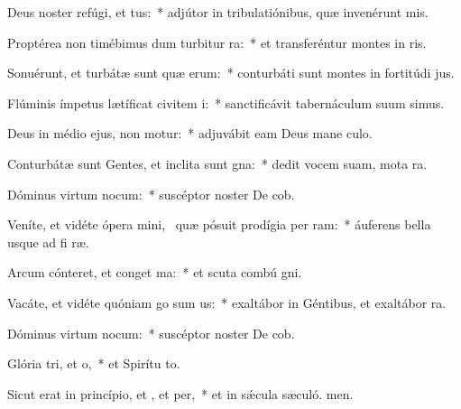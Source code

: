 \item Deus noster refúgi, et tus:~* adjútor in tribulatiónibus, quæ invenérunt  mis.
\item Proptérea non timébimus dum turbitur ra:~* et transferéntur montes in  ris.
\item Sonuérunt, et turbátæ sunt quæ erum:~* conturbáti sunt montes in fortitúdi jus.
\item Flúminis ímpetus lætíficat civitem i:~* sanctificávit tabernáculum suum simus.
\item Deus in médio ejus, non motur:~* adjuvábit eam Deus mane culo.
\item Conturbátæ sunt Gentes, et inclita sunt gna:~* dedit vocem suam, mota  ra.
\item Dóminus virtum nocum:~* suscéptor noster De cob.
\item Veníte, et vidéte ópera mini,~\pscross{} quæ pósuit prodígia per ram:~* áuferens bella usque ad fi ræ.
\item Arcum cónteret, et conget ma:~* et scuta combú gni.
\item Vacáte, et vidéte quóniam go sum us:~* exaltábor in Géntibus, et exaltábor  ra.
\item Dóminus virtum nocum:~* suscéptor noster De cob.
\item Glória tri, et o,~* et Spirítu to.
\item Sicut erat in princípio, et , et per,~* et in sǽcula sæculó. men.
